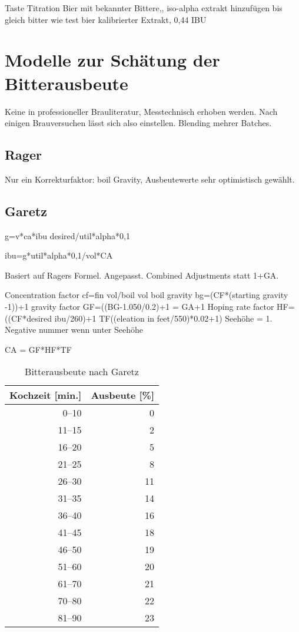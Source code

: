 \documentclass[a4paper,parskip=half]{scrartcl}
\begin{document}
\parencite[145-151]{Garetz1994}
Taste Titration 
Bier mit bekannter Bittere,, iso-alpha extrakt hinzufügen
bis gleich bitter wie test bier kalibrierter Extrakt, 0,44 IBU


\section*{Modelle zur Schätung der Bitterausbeute}

\parencite[127]{Garetz1994} 
Keine in professioneller Brauliteratur, Messtechnisch erhoben
werden. Nach einigen Brauversuchen lässt sich also einstellen.
Blending mehrer Batches.

\subsection*{Rager}

\parencite[134]{Garetz1994} 
Nur ein Korrekturfaktor: boil Gravity, Ausbeutewerte sehr optimistisch
gewählt. 

\subsection*{Garetz}

g=v*ca*ibu desired/util*alpha*0,1

ibu=g*util*alpha*0,1/vol*CA

\parencite[134-144]{Garetz1994} 
Basiert auf Ragers Formel. Angepasst. Combined
Adjustments statt 1+GA.

Concentration factor
cf=fin vol/boil vol
boil gravity bg=(CF*(starting gravity -1))+1
gravity factor
GF=((BG-1.050/0.2)+1 = GA+1
Hoping rate factor
HF=((CF*desired ibu/260)+1
TF((eleation in feet/550)*0.02+1)
Seehöhe = 1. Negative nummer wenn unter Seehöhe

CA = GF*HF*TF

\begin{table}[H]
\centering
\begin{tabular}{rr}
\toprule
Kochzeit [min.] & Ausbeute [\%] \\
\midrule
0–10            & 0 \\
11–15           & 2 \\
16–20           & 5 \\
21–25           & 8 \\
26–30           & 11 \\
31–35           & 14 \\
36–40           & 16 \\
41–45           & 18 \\
46–50           & 19 \\
51–60           & 20 \\
61–70           & 21 \\
70–80           & 22 \\
81–90           & 23 \\
\bottomrule
\end{tabular}
\caption{Bitterausbeute nach Garetz \parencite[138]{Garetz1994}}
\label{table:garetzutil}
\end{table}
\end{document}
